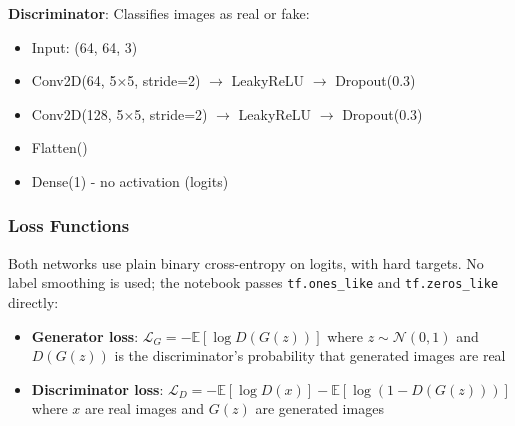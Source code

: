 \documentclass[ai,article,submit,pdftex,moreauthors]{Definitions/mdpi}
\begin{document}
\textbf{Discriminator}: Classifies images as real or fake:
\begin{itemize}[leftmargin=*, itemsep=2pt]
    \item Input: (64, 64, 3)
    \item Conv2D(64, 5$\times$5, stride=2) $\rightarrow$ LeakyReLU $\rightarrow$ Dropout(0.3)
    \item Conv2D(128, 5$\times$5, stride=2) $\rightarrow$ LeakyReLU $\rightarrow$ Dropout(0.3)
    \item Flatten()
    \item Dense(1) - no activation (logits)
\end{itemize}

\subsubsection{Loss Functions}

Both networks use plain binary cross-entropy on logits, with hard targets. No label smoothing is used; the notebook passes \texttt{tf.ones\_like} and \texttt{tf.zeros\_like} directly:
\begin{itemize}[leftmargin=*, itemsep=2pt]
    \item \textbf{Generator loss}: $\mathcal{L}_G = -\mathbb{E}[\log D(G(z))]$ where $z \sim \mathcal{N}(0,1)$ and $D(G(z))$ is the discriminator's probability that generated images are real
    \item \textbf{Discriminator loss}: $\mathcal{L}_D = -\mathbb{E}[\log D(x)] - \mathbb{E}[\log(1-D(G(z)))]$ where $x$ are real images and $G(z)$ are generated images
\end{itemize}
\end{document}
